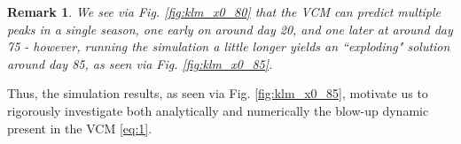 \documentclass[sn-mathphys-num]{sn-jnl}
\newtheorem{lemma}[theorem]{Lemma}
\newtheorem{remark}{Remark}
\numberwithin{equation}{section}
\numberwithin{equation}{section}
\begin{document}





\begin{remark}
We see via Fig. \ref{fig:klm_x0_80} that the VCM can predict multiple peaks in a single season, one early on around day 20, and one later at around day 75 - however, running the simulation a little longer yields an ``exploding" solution around day 85, as seen via Fig. \ref{fig:klm_x0_85}.
    \end{remark}
Thus, the simulation results, as seen via Fig. \ref{fig:klm_x0_85}, motivate us to rigorously investigate both analytically and numerically the blow-up dynamic present in the VCM \eqref{eq:1}.
\end{document}
